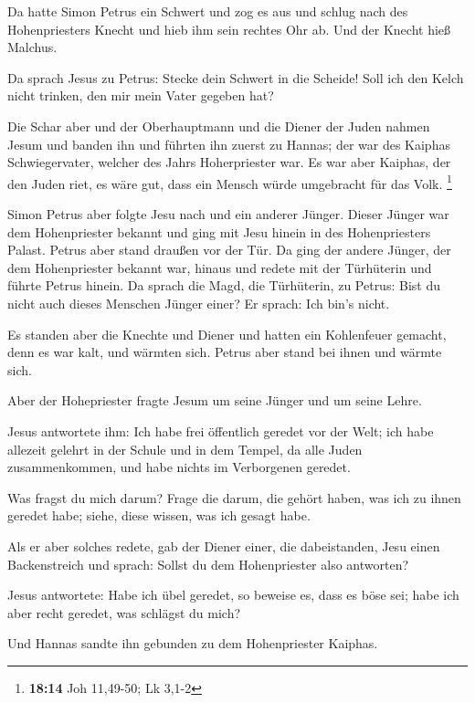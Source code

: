 Da hatte Simon Petrus ein Schwert und zog es aus und
schlug nach des Hohenpriesters Knecht und hieb ihm sein rechtes Ohr ab.
Und der Knecht hieß Malchus.

 Da sprach Jesus zu Petrus: Stecke dein Schwert in die
Scheide! Soll ich den Kelch nicht trinken, den mir mein Vater gegeben
hat?

 Die Schar aber und der Oberhauptmann und die Diener der
Juden nahmen Jesum und banden ihn  und führten ihn zuerst
zu Hannas; der war des Kaiphas Schwiegervater, welcher des Jahrs
Hoherpriester war.  Es war aber Kaiphas, der den Juden
riet, es wäre gut, dass ein Mensch würde umgebracht für das Volk.
\footnote{\textbf{18:14} Joh 11,49-50; Lk 3,1-2}

 Simon Petrus aber folgte Jesu nach und ein anderer Jünger.
Dieser Jünger war dem Hohenpriester bekannt und ging mit Jesu hinein in
des Hohenpriesters Palast.  Petrus aber stand draußen vor
der Tür. Da ging der andere Jünger, der dem Hohenpriester bekannt war,
hinaus und redete mit der Türhüterin und führte Petrus hinein.
 Da sprach die Magd, die Türhüterin, zu Petrus: Bist du
nicht auch dieses Menschen Jünger einer? Er sprach: Ich bin's nicht.

 Es standen aber die Knechte und Diener und hatten ein
Kohlenfeuer gemacht, denn es war kalt, und wärmten sich. Petrus aber
stand bei ihnen und wärmte sich.

 Aber der Hohepriester fragte Jesum um seine Jünger und um
seine Lehre.

 Jesus antwortete ihm: Ich habe frei öffentlich geredet vor
der Welt; ich habe allezeit gelehrt in der Schule und in dem Tempel, da
alle Juden zusammenkommen, und habe nichts im Verborgenen geredet.

 Was fragst du mich darum? Frage die darum, die gehört
haben, was ich zu ihnen geredet habe; siehe, diese wissen, was ich
gesagt habe.

 Als er aber solches redete, gab der Diener einer, die
dabeistanden, Jesu einen Backenstreich und sprach: Sollst du dem
Hohenpriester also antworten?

 Jesus antwortete: Habe ich übel geredet, so beweise es,
dass es böse sei; habe ich aber recht geredet, was schlägst du mich?

 Und Hannas sandte ihn gebunden zu dem Hohenpriester
Kaiphas.

